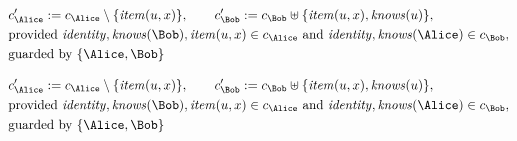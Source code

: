 \begin{align*}
&
c'_
{
\Alice
}
 := 
c_
{
\Alice
}
 \setminus 
\{
\mathit{
item
}
(
u
,
x
)
\}
, \qquad 
c'_
{
\Bob
}
 := 
c_
{
\Bob
}
 \uplus 
\{
\mathit{
item
}
(
u
,
x
)
,
\mathit{
knows
}
(
u
)
\}
,\\
&
\text{provided } 
\mathit{
identity
}
,
\mathit{
knows
}
(
\Bob
)
,
\mathit{
item
}
(
u
,
x
)
 \in c_
{
\Alice
}
 \text{ and } 
\mathit{
identity
}
,
\mathit{
knows
}
(
\Alice
)
 \in c_
{
\Bob
}
,\\
&
\text{guarded by } \{
\Alice
,
\Bob
\}
\end{align*}

\begin{align*}
&
c'_
{
\Alice
}
 := 
c_
{
\Alice
}
 \setminus 
\{
\mathit{
item
}
(
u
,
x
)
\}
, \qquad 
c'_
{
\Bob
}
 := 
c_
{
\Bob
}
 \uplus 
\{
\mathit{
item
}
(
u
,
x
)
,
\mathit{
knows
}
(
u
)
\}
,\\
&
\text{provided } 
\mathit{
identity
}
,
\mathit{
knows
}
(
\Bob
)
,
\mathit{
item
}
(
u
,
x
)
 \in c_
{
\Alice
}
 \text{ and } 
\mathit{
identity
}
,
\mathit{
knows
}
(
\Alice
)
 \in c_
{
\Bob
}
,\\
&
\text{guarded by } \{
\Alice
,
\Bob
\}
\end{align*}

